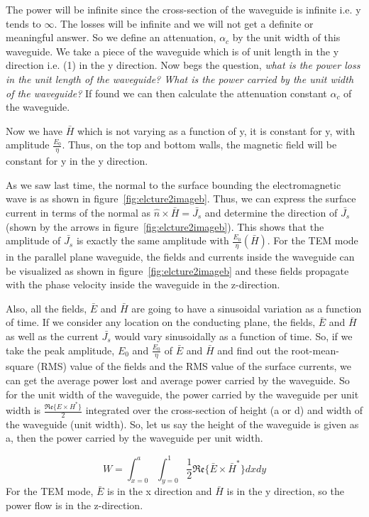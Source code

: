 The power will be infinite since the cross-section of the waveguide is infinite i.e. y tends to $\infty$. The losses will be infinite and we will not get a definite or meaningful answer. So we define an attenuation, $\alpha_{c}$ by the unit width of this waveguide. We take a piece of the waveguide which is of unit length in the y direction i.e. (1) in the y direction. Now begs the question, \emph{what is the power loss in the unit length of the waveguide? What is the power carried by the unit width of the waveguide?} If found we can then calculate the attenuation constant $\alpha_{c}$ of the waveguide.

Now we have $\bar{H}$ which is not varying as a function of y, it is constant for y, with amplitude $\frac{E_0}{\eta}$. Thus, on the top and bottom walls, the magnetic field will be constant for y in the y direction.

As we saw last time, the normal to the surface bounding the electromagnetic wave is as shown in figure~\ref{fig:elcture2imageb}. Thus, we can express the surface current in terms of the normal as $\hat{n}\times\bar{H}=\bar{J_s}$ and determine the direction of $\bar{J_s}$ (shown by the arrows in figure~\ref{fig:elcture2imageb}). This shows that the amplitude of $\bar{J_s}$ is exactly the same amplitude with $\frac{E_0}{\eta}(\bar{H})$. For the TEM mode in the parallel plane waveguide, the fields and currents inside the waveguide can be visualized as shown in figure~\ref{fig:elcture2imageb} and these fields propagate with the phase velocity inside the waveguide in the z-direction.

Also, all the fields, $\bar{E}$ and $\bar{H}$ are going to have a sinusoidal variation as a function of time. If we consider any location on the conducting plane, the fields, $\bar{E}$ and $\bar{H}$ as well as the current $\bar{J_s}$ would vary sinusoidally as a function of time. So, if we take the peak amplitude, $E_0$ and $\frac{E_0}{\eta}$ of $\bar{E}$ and $\bar{H}$ and find out the root-mean-square (RMS) value of the fields and the RMS value of the surface currents, we can get the average power lost and average power carried by the waveguide. So for the unit width of the waveguide, the power carried by the waveguide per unit width is $\frac{\mathfrak{Re}\lbrace E \times H^*\rbrace}{2}$ integrated over the cross-section of height (a or d) and width of the waveguide (unit width). So, let us say the height of the waveguide is given as a, then the power carried by the waveguide per unit width.

\begin{equation}
W=\int_{x=0}^{a}\int_{y=0}^{1} \frac{1}{2}\mathfrak{Re}\lbrace\bar{E} \times \bar{H}^\ast\rbrace dxdy
\label{eqn:powerparawaveguide}	
\end{equation}
For the TEM mode, $\bar{E}$ is in the x direction and $\bar{H}$ is in the y direction, so the power flow is in the z-direction.

